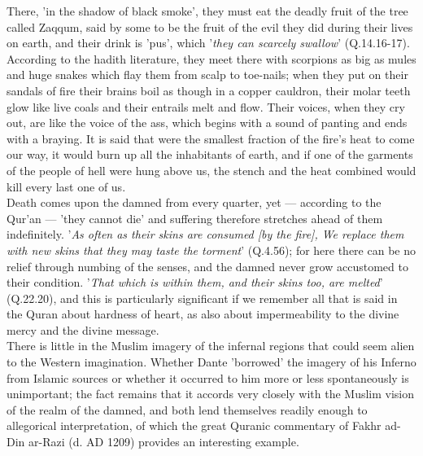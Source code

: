 \documentclass[10pt, twoside,openright]{book}
\begin{document}
There, 'in the shadow of black smoke', they must eat the deadly fruit of the tree called Zaqqum, said 
by some to be the fruit of the evil they did during their lives on earth, and their drink is 'pus', 
which '\emph{they can scarcely swallow}' (Q.14.16\hyp{}17). According to the hadith literature, they meet there 
with scorpions as big as mules and huge snakes which flay them from scalp to toe\hyp{}nails; when they put 
on their sandals of fire their brains boil as though in a copper cauldron, their molar teeth glow 
like live coals and their entrails melt and flow. Their voices, when they cry out, are like the voice 
of the ass, which begins with a sound of panting and ends with a braying. It is said that were the 
smallest fraction of the fire's heat to come our way, it would burn up all the inhabitants of earth, 
and if one of the garments of the people of hell were hung above us, the stench and the heat combined 
would kill every last one of us. \\

Death comes upon the damned from every quarter, yet --- according to the Qur'an --- 'they cannot die' and 
suffering therefore stretches ahead of them indefinitely. '\emph{As often as their skins are consumed [by 
the fire], We replace them with new skins that they may taste the torment}' (Q.4.56); for here there 
can be no relief through numbing of the senses, and the damned never grow accustomed to their 
condition. '\emph{That which is within them, and their skins too, are melted}' (Q.22.20), and this is 
particularly significant if we remember all that is said in the Quran about hardness of heart, as 
also about impermeability to the divine mercy and the divine message. \\

There is little in the Muslim imagery of the infernal regions that could seem alien to the Western 
imagination. Whether Dante 'borrowed' the imagery of his Inferno from Islamic sources or whether it 
occurred to him more or less spontaneously is unimportant; the fact remains that it accords very 
closely with the Muslim vision of the realm of the damned, and both lend themselves readily enough to 
allegorical interpretation, of which the great Quranic commentary of Fakhr ad\hyp{}Din ar\hyp{}Razi (d. AD 
1209) provides an interesting example. \\
\end{document}
